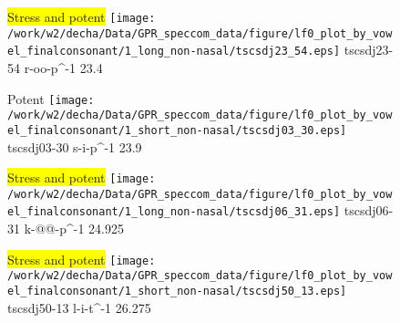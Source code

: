 \documentclass{article}
\begin{document}
\begin{figure}[t]
\begin{minipage}[b]{.24\textwidth}
\colorbox{yellow}{Stress and potent}
\centering
\texttt{[image: /work/w2/decha/Data/GPR\_speccom\_data/figure/lf0\_plot\_by\_vowel\_finalconsonant/1\_long\_non-nasal/tscsdj23\_54.eps]}
tscsdj23-54 r-oo-p\textasciicircum-1 23.4
\end{minipage}
\begin{minipage}[b]{.24\textwidth}
\colorbox{Apricot}{Potent}
\centering
\texttt{[image: /work/w2/decha/Data/GPR\_speccom\_data/figure/lf0\_plot\_by\_vowel\_finalconsonant/1\_short\_non-nasal/tscsdj03\_30.eps]}
tscsdj03-30 s-i-p\textasciicircum-1 23.9
\end{minipage}
\begin{minipage}[b]{.24\textwidth}
\colorbox{yellow}{Stress and potent}
\centering
\texttt{[image: /work/w2/decha/Data/GPR\_speccom\_data/figure/lf0\_plot\_by\_vowel\_finalconsonant/1\_long\_non-nasal/tscsdj06\_31.eps]}
tscsdj06-31 k-@@-p\textasciicircum-1 24.925
\end{minipage}
\begin{minipage}[b]{.24\textwidth}
\colorbox{yellow}{Stress and potent}
\centering
\texttt{[image: /work/w2/decha/Data/GPR\_speccom\_data/figure/lf0\_plot\_by\_vowel\_finalconsonant/1\_short\_non-nasal/tscsdj50\_13.eps]}
tscsdj50-13 l-i-t\textasciicircum-1 26.275
\end{minipage}
\end{figure}
\end{document}
